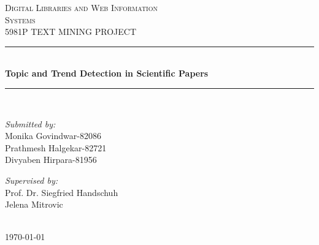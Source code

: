 \documentclass[12pt]{article}
\begin{document}
\begin{titlepage}

\newcommand{\HRule}{\rule{\linewidth}{0.5mm}}
\center
\textsc{\LARGE Digital Libraries and Web Information}\\ [0.3cm]
\textsc{\LARGE Systems}\\[1cm]
\textsc{\Large 5981P TEXT MINING PROJECT}\\[1.8cm]

\HRule \\[0.4cm]{ \huge \bfseries Topic and Trend Detection in Scientific Papers}\\[0.4cm]\HRule \\[1.5cm]
\begin{minipage}{0.4\textwidth}
\begin{flushleft} \large
\emph{Submitted by:}\\
Monika Govindwar-82086\\
Prathmesh Halgekar-82721\\
Divyaben Hirpara-81956 %
\end{flushleft}
\end{minipage}
\begin{minipage}{0.4\textwidth}
\begin{flushright} \large
\emph{Supervised by:} \\
Prof. Dr. Siegfried Handschuh\\
Jelena Mitrovic %
\end{flushright}
\end{minipage}\\[2cm]
{\large \today}\\[2cm]
\vfill
\end{titlepage}

\author
{Prathmesh Halgekar$-82721$ , Monika Govindwar$-82086$ , Divyaben Hirpara$-81956$\\
\\
\normalsize{
Prof. Dr. Siegfried Handschuh, Jelena Mitrovic}\\
\normalsize{Chair of Digital Libraries and Web Information Systems}\\
\normalsize{Text Mining Project}\\
\\
\normalsize{ }
}

\end{document}
